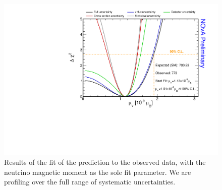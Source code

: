 \begin{figure}[hbtp]
\centering
\includegraphics[width=\textwidth]{Plots/NuMM/NuMMLimit_FinalMoneyPlot.pdf}
\caption[Fit results]{Results of the fit of the prediction to the observed data, with the neutrino magnetic moment as the sole fit parameter. We are profiling over the full range of systematic uncertainties.}
\label{fig:NuMMResults_ChisqLimit}
\end{figure}




